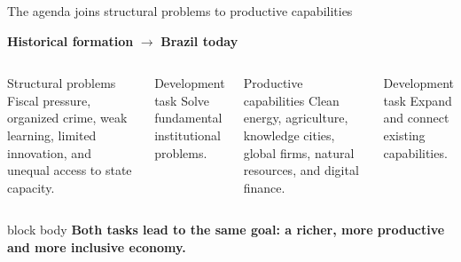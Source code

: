 \documentclass[10pt,aspectratio=169]{beamer}
\newcommand{\question}[1]{%
  \begin{beamercolorbox}[rounded=true,sep=0.55em,wd=\textwidth]{block body}
    \centering\large\textbf{#1}
  \end{beamercolorbox}}
\begin{document}
\begin{frame}{The agenda joins structural problems to productive capabilities}
  \begin{center}
    \textbf{Historical formation} $\longrightarrow$ \textbf{Brazil today}
  \end{center}
  \vspace{.05cm}
  \begin{columns}[T,onlytextwidth]
      \begin{block}{Structural problems}
        Fiscal pressure, organized crime, weak learning, limited innovation, and unequal access to state capacity.
      \end{block}
      \begin{exampleblock}{Development task}
        Solve fundamental institutional problems.
      \end{exampleblock}
      \begin{block}{Productive capabilities}
        Clean energy, agriculture, knowledge cities, global firms, natural resources, and digital finance.
      \end{block}
      \begin{exampleblock}{Development task}
        Expand and connect existing capabilities.
      \end{exampleblock}
  \end{columns}
  \vspace{.12cm}
  \question{Both tasks lead to the same goal: a richer, more productive and more inclusive economy.}
\end{frame}
\end{document}
